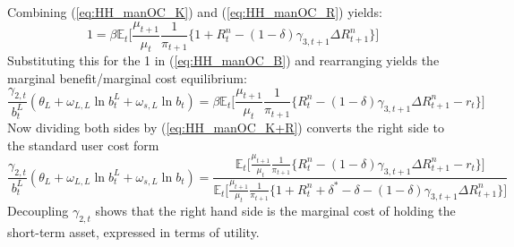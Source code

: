 \documentclass[11pt,a4paper,margin=1.5in]{article}
\begin{document}
Combining (\ref{eq:HH_manOC_K}) and (\ref{eq:HH_manOC_R}) yields:
\begin{equation}
	1 = \beta\mathbb{E}_t \Bigg[ \frac{\mu_{t+1}}{\mu_{t}}\frac{1}{\pi_{t+1}} \Big\{ 1 + R^n_t - (1-\delta)\gamma_{3,t+1}\Delta R^n_{t+1}\Big\}\Bigg]
	\label{eq:HH_manOC_K+R}
\end{equation}
Substituting this for the 1 in (\ref{eq:HH_manOC_B}) and rearranging yields the marginal benefit/marginal cost equilibrium:
\begin{equation}
	\frac{\gamma_{2,t}}{b^L_t}\left(\theta_L + \omega_{L,L}\ln b^L_t + \omega_{s,L}\ln b_t\right) = \beta\mathbb{E}_t \Bigg[ \frac{\mu_{t+1}}{\mu_{t}}\frac{1}{\pi_{t+1}} \Big\{ R^n_t - (1-\delta)\gamma_{3,t+1}\Delta R^n_{t+1} - r_t \Big\}\Bigg]
\end{equation}
Now dividing both sides by (\ref{eq:HH_manOC_K+R}) converts the right side to the standard user cost form
\begin{equation}
	\frac{\gamma_{2,t}}{b^L_t}\left(\theta_L + \omega_{L,L}\ln b^L_t + \omega_{s,L}\ln b_t\right) = \frac{\mathbb{E}_t \Big[ \frac{\mu_{t+1}}{\mu_{t}}\frac{1}{\pi_{t+1}} \Big\{ R^n_t - (1-\delta)\gamma_{3,t+1}\Delta R^n_{t+1} - r_t \Big\}\Big]}{\mathbb{E}_t \Big[ \frac{\mu_{t+1}}{\mu_{t}}\frac{1}{\pi_{t+1}} \Big\{ 1+ R^n_t + \delta^* - \delta - (1-\delta)\gamma_{3,t+1}\Delta R^n_{t+1}\Big\}\Big]}
	\label{eq:HH_manOC_usercost}
\end{equation}
Decoupling $\gamma_{2,t}$ shows that the right hand side is the marginal cost of holding the short-term asset, expressed in terms of utility.
\end{document}
